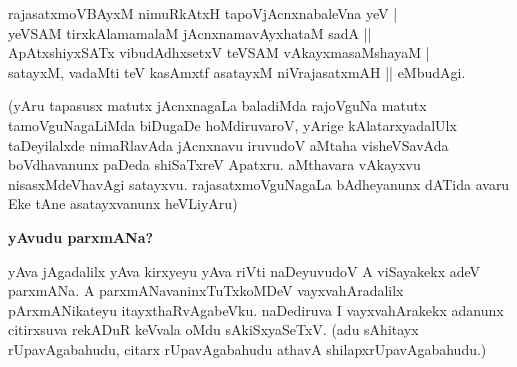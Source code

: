 \begin{shloka}
rajasatxmoVBAyxM nimuRkAtxH tapoVjAcnxnabaleVna yeV |\\\label{135}
yeVSAM tirxkAlamamalaM jAcnxnamavAyxhataM sadA ||\\
ApAtxshiyxSATx vibudAdhxsetxV teVSAM vAkayxmasaMshayaM |\\
satayxM, vadaMti teV kasAmxtf asatayxM niVrajasatxmAH || eMbudAgi.
\end{shloka}

\noindent
(yAru tapasusx matutx jAcnxnagaLa baladiMda rajoVguNa matutx tamoVguNagaLiMda biDugaDe hoMdi\-ruvaroV, yArige kAlatarxyadalUlx taDeyilalxde nimaRlavAda jAcnxnavu iruvudoV aMtaha visheVSa\-vAda boVdhavanunx paDeda shiSaTxreV Apatxru. aMthavara vAkayxvu nisasxMdeVhavAgi satayxvu. rajasatxmoVguNa\-gaLa bAdheyanunx dATida avaru Eke tAne asatayxvanunx heVLiyAru)

{\bigskip
\noindent
{\large\bf yAvudu parxmANa?}}\label{page134}
\medskip

\noindent
yAva jAgadalilx yAva kirxyeyu yAva riVti naDeyuvudoV A viSayakekx adeV parxmANa. A parxmANavaninxTuTxkoMDeV vayxvahAradalilx pArxmANikateyu itayxthaRvAgabeVku. naDediruva I vayxva\-hArakekx adanunx citirxsuva rekADuR keVvala oMdu sAkiSxyaSeTxV. (adu sAhitayx rUpavAgabahudu, citarx rUpavAgabahudu athavA shilapxrUpavAgabahudu.)


